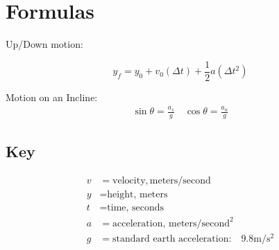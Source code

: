 \documentclass[../Notes.tex]{subfiles}
\begin{document}
    \section{Formulas}
    \begin{center}
        Up/Down motion:

        \begin{equation}
            \label{eqn::yfinal}
            y_{f} = y_{0} + v_{0}(\Delta t) + \frac{1}{2}a(\Delta t^{2})
        \end{equation}


        Motion on an Incline:
        \begin{equation}
            \begin{gathered}
                \sin \theta = \frac{a_s}{g} \quad \cos \theta = \frac{a_n}{g}        
            \end{gathered}
        \end{equation}
    \end{center}

    \subsection{Key}

    \begin{align*}
        v & = \text{velocity}, \text{meters} / \text{second}        \\
        y & = \text{height, meters}                                 \\
        t & = \text{time, seconds}                                  \\
        a & = \text{acceleration, } \text{meters} / \text{second}^2 \\
        g & = \text{standard earth acceleration:} \quad 9.8 \text{m} / \text{s}^2
    \end{align*}
\end{document}
